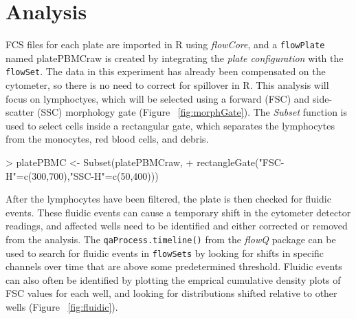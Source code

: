 \documentclass[12pt]{article}
\newcommand{\Rfunction}[1]{{\texttt{#1()}}}
\newcommand{\Rclass}[1]{{\texttt{#1}}}
\newcommand{\Robject}[1]{{\texttt{#1}}}
\newcommand{\Rpackage}[1]{{\textit{#1}}}
\begin{document}
\section{Analysis}
FCS files for each plate are imported in R using \Rpackage{flowCore}, and a \Robject{flowPlate} named platePBMCraw is created by integrating
the \textit{plate configuration} with the \Robject{flowSet}. The data in this experiment has already been compensated on
the cytometer, so there is no need to correct for spillover in R. This analysis will focus on lymphoctyes, which
will be selected using a forward (FSC) and side-scatter (SSC) morphology gate (Figure ~\ref{fig:morphGate}).
The \textit{Subset} function is used to select cells inside a rectangular gate, which separates the lymphocytes
from the monocytes, red blood cells, and debris.
\begin{Schunk}
\begin{Sinput}
> platePBMC <- Subset(platePBMCraw,
+ 		rectangleGate("FSC-H"=c(300,700),"SSC-H"=c(50,400)))	
\end{Sinput}
\end{Schunk}

After the lymphocytes have been filtered, the plate is then checked for fluidic events.
These fluidic events can cause a temporary shift in the cytometer detector readings, and affected wells need
to be identified and either corrected or removed from the analysis. The \Rfunction{qaProcess.timeline} from
the \Rpackage{flowQ} package can be used to search for fluidic events in \Rclass{flowSets} by looking for shifts in specific channels over time that
are above some predetermined threshold. Fluidic events can also often be identified by plotting the emprical cumulative density plots of FSC
values for each well, and looking for distributions shifted relative to other wells (Figure ~\ref{fig:fluidic}).
\end{document}
